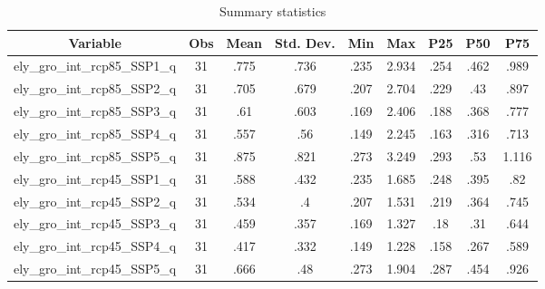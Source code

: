 \begin{table}[htbp]\centering \caption{Summary statistics\label{sumstat}}
\begin{tabular}{l c c c c c c c c}\hline\hline
\multicolumn{1}{c}{Variable} & Obs & Mean & Std. Dev.
 & Min & Max & P25 & P50 & P75  \\ \hline
ely\_gro\_int\_rcp85\_SSP1\_q & 31 & .775 & .736 & .235 & 2.934 & .254 & .462 & .989 \\
ely\_gro\_int\_rcp85\_SSP2\_q & 31 & .705 & .679 & .207 & 2.704 & .229 & .43 & .897 \\
ely\_gro\_int\_rcp85\_SSP3\_q & 31 & .61 & .603 & .169 & 2.406 & .188 & .368 & .777 \\
ely\_gro\_int\_rcp85\_SSP4\_q & 31 & .557 & .56 & .149 & 2.245 & .163 & .316 & .713 \\
ely\_gro\_int\_rcp85\_SSP5\_q & 31 & .875 & .821 & .273 & 3.249 & .293 & .53 & 1.116 \\
ely\_gro\_int\_rcp45\_SSP1\_q & 31 & .588 & .432 & .235 & 1.685 & .248 & .395 & .82 \\
ely\_gro\_int\_rcp45\_SSP2\_q & 31 & .534 & .4 & .207 & 1.531 & .219 & .364 & .745 \\
ely\_gro\_int\_rcp45\_SSP3\_q & 31 & .459 & .357 & .169 & 1.327 & .18 & .31 & .644 \\
ely\_gro\_int\_rcp45\_SSP4\_q & 31 & .417 & .332 & .149 & 1.228 & .158 & .267 & .589 \\
ely\_gro\_int\_rcp45\_SSP5\_q & 31 & .666 & .48 & .273 & 1.904 & .287 & .454 & .926 \\
\hline\end{tabular}
\end{table}
